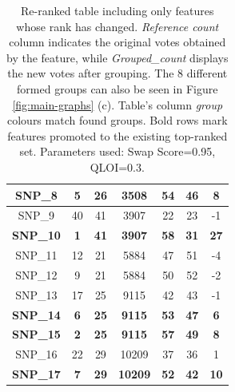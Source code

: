 \begin{table}[!hpt]
{\begin{tabular}{|c|c|c|c|c|c|c|}
\textbf{SNP\_8}  & \textbf{5}                & \textbf{26}             & \cellcolor[HTML]{EDBF55}\textbf{3508}  & \textbf{54}              & \textbf{46}            & \textbf{8}            \\ \hline
SNP\_9           & 40                        & 41                      & \cellcolor[HTML]{6FF58E}3907           & 22                       & 23                     & -1                    \\ \hline
\textbf{SNP\_10} & \textbf{1}                & \textbf{41}             & \cellcolor[HTML]{6FF58E}\textbf{3907}  & \textbf{58}              & \textbf{31}            & \textbf{27}           \\ \hline
SNP\_11          & 12                        & 21                      & \cellcolor[HTML]{343DFA}5884           & 47                       & 51                     & -4                    \\ \hline
SNP\_12          & 9                         & 21                      & \cellcolor[HTML]{343DFA}5884           & 50                       & 52                     & -2                    \\ \hline
SNP\_13          & 17                        & 25                      & \cellcolor[HTML]{8833FB}9115           & 42                       & 43                     & -1                    \\ \hline
\textbf{SNP\_14} & \textbf{6}                & \textbf{25}             & \cellcolor[HTML]{8833FB}\textbf{9115}  & \textbf{53}              & \textbf{47}            & \textbf{6}            \\ \hline
\textbf{SNP\_15} & \textbf{2}                & \textbf{25}             & \cellcolor[HTML]{8833FB}\textbf{9115}  & \textbf{57}              & \textbf{49}            & \textbf{8}            \\ \hline
SNP\_16          & 22                        & 29                      & \cellcolor[HTML]{E62E25}10209          & 37                       & 36                     & 1                     \\ \hline
\textbf{SNP\_17} & \textbf{7}                & \textbf{29}             & \cellcolor[HTML]{E62E25}\textbf{10209} & \textbf{52}              & \textbf{42}            & \textbf{10}           \\ \hline
\end{tabular}%
}
\caption{Re-ranked table including only features whose rank has changed. \emph{Reference count} column indicates the original votes obtained by the feature, while \emph{Grouped\_count} displays the new votes after grouping. The 8 different formed groups can also be seen in Figure \ref{fig:main-graphs} (c). Table's column \emph{group} colours match found groups. Bold rows mark features promoted to the existing top-ranked set. Parameters used: Swap Score=0.95, QLOI=0.3.}
\label{tbl:rerank}
\end{table}
\\

